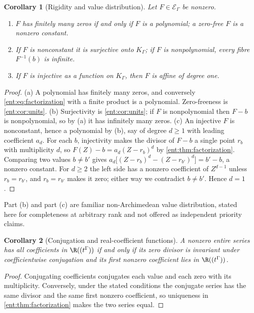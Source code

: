 \documentclass[11pt]{article}
\theoremstyle{plain}
\theoremstyle{plain}
\theoremstyle{plain}
\newtheorem{corollary}[corollary]{Corollary}
\theoremstyle{definition}
\theoremstyle{definition}
\theoremstyle{definition}
\theoremstyle{definition}
\theoremstyle{remark}
\newcommand{\K}{K_\Gamma}\newcommand{\KD}{K_\Delta}
\newcommand{\E}{\mathcal E_\Gamma}
\begin{document}
\begin{corollary}[Rigidity and value distribution]
\label{ent:cor:value-distribution}
Let $F\in\E$ be nonzero.
\begin{enumerate}[label=\textnormal{(\alph*)},leftmargin=2em]
\item $F$ has finitely many zeros if and only if $F$ is a polynomial; a
zero-free $F$ is a nonzero constant.
\item If $F$ is nonconstant it is surjective onto $\K$; if $F$ is
nonpolynomial, every fibre $F^{-1}(b)$ is infinite.
\item If $F$ is injective as a function on $\K$, then $F$ is affine of
degree one.
\end{enumerate}
\end{corollary}
\begin{proof}
(a) A polynomial has finitely many zeros, and conversely
\eqref{ent:eq:factorization} with a finite product is a polynomial.
Zero-freeness is \cref{ent:cor:units}. (b) Surjectivity is
\cref{ent:cor:units}; if $F$ is nonpolynomial then $F-b$ is nonpolynomial,
so by (a) it has infinitely many zeros. (c) An injective $F$ is nonconstant,
hence a polynomial by (b), say of degree $d\ge1$ with leading coefficient
$a_d$. For each $b$, injectivity makes the divisor of $F-b$ a single point
$r_b$ with multiplicity $d$, so $F(Z)-b=a_d(Z-r_b)^d$ by
\cref{ent:thm:factorization}. Comparing two values $b\ne b'$ gives
$a_d\bigl[(Z-r_b)^d-(Z-r_{b'})^d\bigr]=b'-b$, a nonzero constant. For
$d\ge2$ the left side has a nonzero coefficient of $Z^{d-1}$ unless
$r_b=r_{b'}$, and $r_b=r_{b'}$ makes it zero; either way we contradict
$b\ne b'$. Hence $d=1$.
\end{proof}

Part (b) and part (c) are familiar non-Archimedean value distribution, stated
here for completeness at arbitrary rank and not offered as independent
priority claims.

\begin{corollary}[Conjugation and real-coefficient functions]
\label{ent:cor:conjugation}
A nonzero entire series has all coefficients in $\R((t^\Gamma))$ if and only
if its zero divisor is invariant under coefficientwise conjugation and its
first nonzero coefficient lies in $\R((t^\Gamma))$.
\end{corollary}
\begin{proof}
Conjugating coefficients conjugates each value and each zero with its
multiplicity. Conversely, under the stated conditions the conjugate series
has the same divisor and the same first nonzero coefficient, so uniqueness in
\cref{ent:thm:factorization} makes the two series equal.
\end{proof}
\end{document}
